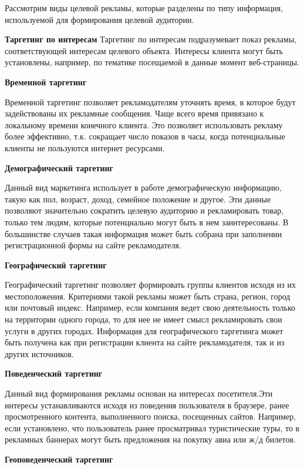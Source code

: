 Рассмотрим виды целевой рекламы, которые разделены по типу информация, используемой для формирования целевой аудитории.

\textbf{Таргетинг по интересам}
Таргетинг по интересам подразумевает показ рекламы, соответствующей интересам целевого объекта. Интересы клиента могут быть установлены, например, по тематике посещаемой в данные момент веб-страницы.

\textbf{Временной таргетинг}

Временной таргетинг позволяет рекламодателям уточнять время, в которое будут задействованы их рекламные сообщения. Чаще всего время привязано к локальному времени конечного клиента. Это позволяет использовать рекламу более эффективно, т.к. сокращает число показов в часы, когда потенциальные клиенты не пользуются интернет ресурсами. \cite{timeTargeting1}
    
\textbf{Демографический таргетинг}

Данный вид маркетинга использует в работе демографическую информацию, такую как пол, возраст, доход, семейное положение и другое. Эти данные позволяют значительно сократить целевую аудиторию и рекламировать товар, только тем людям, которые потенциально могут быть в нем заинтересованы. В большинстве случаев такая информация может быть собрана при заполнении регистрационной формы на сайте рекламодателя.

\textbf{Географический таргетинг}

Географический таргетинг позволяет формировать группы клиентов исходя из их местоположения. Критериями такой рекламы может быть страна,  регион, город или почтовый индекс. Например, если компания ведет свою деятельность только на территории одного города, то для нее не имеет смысл рекламировать свои услуги в других городах. Информация для географического таргетинга может быть получена как при регистрации клиента на сайте рекламодателя, так и из других источников.\cite{kindOfTarget1}

\textbf{Поведенческий таргетинг}

Данный вид формирования рекламы основан на интересах посетителя.Эти интересы устанавливаются исходя из поведения пользователя в браузере, ранее просмотренного контента, выполненного поиска, посещенных сайтов. Например, если установлено, что пользователь ранее просматривал туристические туры, то в рекламных баннерах могут быть предложения на покупку авиа или ж/д билетов. 
        
\textbf{Геоповеденческий таргетинг}

